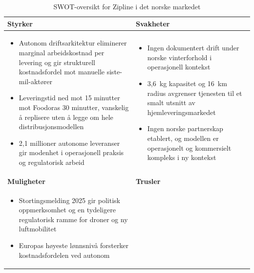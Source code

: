 \begin{table}[H]
\centering
\caption{SWOT-oversikt for Zipline i det norske markedet}
\label{tab:swot}
\renewcommand{\arraystretch}{1.4}
\begin{tabularx}{\textwidth}{@{} X X @{}}
\toprule
\rowcolor{tableheader}
\color{white}\textbf{Styrker} & \color{white}\textbf{Svakheter} \\
\midrule
\rowcolor{tablerow}
\begin{minipage}[t]{\linewidth}
\begin{itemize}[leftmargin=1.2em, nosep]
  \item Autonom driftsarkitektur eliminerer marginal arbeidskostnad per
  levering og gir strukturell kostnadsfordel mot manuelle siste-mil-aktører
  \item Leveringstid ned mot 15 minutter mot Foodoras 30 minutter, vanskelig å
  replisere uten å legge om hele distribusjonsmodellen
  \item 2{,}1 millioner autonome leveranser gir modenhet i operasjonell
  praksis og regulatorisk arbeid
\end{itemize}
\vspace{0.4em}
\end{minipage}
&
\begin{minipage}[t]{\linewidth}
\begin{itemize}[leftmargin=1.2em, nosep]
  \item Ingen dokumentert drift under norske vinterforhold i operasjonell
  kontekst
  \item 3{,}6~kg kapasitet og 16~km radius avgrenser tjenesten til et smalt
  utsnitt av hjemleveringsmarkedet
  \item Ingen norske partnerskap etablert, og modellen er operasjonelt og
  kommersielt kompleks i ny kontekst
\end{itemize}
\vspace{0.4em}
\end{minipage} \\
\midrule
\rowcolor{tableheader}
\color{white}\textbf{Muligheter} & \color{white}\textbf{Trusler} \\
\midrule
\rowcolor{tablerow}
\begin{minipage}[t]{\linewidth}
\begin{itemize}[leftmargin=1.2em, nosep]
  \item Stortingsmelding 2025 gir politisk oppmerksomhet og en tydeligere
  regulatorisk ramme for droner og ny luftmobilitet
  \item Europas høyeste lønnsnivå forsterker kostnadsfordelen ved autonom

\end{itemize}
\end{minipage}
\end{tabularx}
\end{table}
